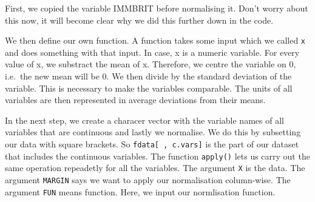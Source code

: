 \documentclass[]{article}
\newenvironment{Shaded}{\begin{snugshade}}{\end{snugshade}}
\newcommand{\CommentTok}[1]{\textcolor[rgb]{0.56,0.35,0.01}{\textit{#1}}}
\newcommand{\ControlFlowTok}[1]{\textcolor[rgb]{0.13,0.29,0.53}{\textbf{#1}}}
\newcommand{\DataTypeTok}[1]{\textcolor[rgb]{0.13,0.29,0.53}{#1}}
\newcommand{\DecValTok}[1]{\textcolor[rgb]{0.00,0.00,0.81}{#1}}
\newcommand{\KeywordTok}[1]{\textcolor[rgb]{0.13,0.29,0.53}{\textbf{#1}}}
\newcommand{\NormalTok}[1]{#1}
\newcommand{\OperatorTok}[1]{\textcolor[rgb]{0.81,0.36,0.00}{\textbf{#1}}}
\newcommand{\StringTok}[1]{\textcolor[rgb]{0.31,0.60,0.02}{#1}}
\begin{document}
\begin{Shaded}
\end{Shaded}

First, we copied the variable IMMBRIT before normalising it. Don't worry about this now, it will become clear why we did this further down in the code.

We then define our own function. A function takes some input which we called \texttt{x} and does something with that input. In case, x is a numeric variable. For every value of x, we substract the mean of x. Therefore, we centre the variable on 0, i.e.~the new mean will be 0. We then divide by the standard deviation of the variable. This is necessary to make the variables comparable. The units of all variables are then represented in average deviations from their means.

In the next step, we create a characer vector with the variable names of all variables that are continuous and lastly we normalise. We do this by subsetting our data with square brackets. So \texttt{fdata{[}\ ,\ c.vars{]}} is the part of our dataset that includes the continuous variables. The function \texttt{apply()} lets us carry out the same operation repeadetly for all the variables. The argument \texttt{X} is the data. The argument \texttt{MARGIN} says we want to apply our normalisation column-wise. The argument \texttt{FUN} means function. Here, we input our normlisation function.
\end{document}
